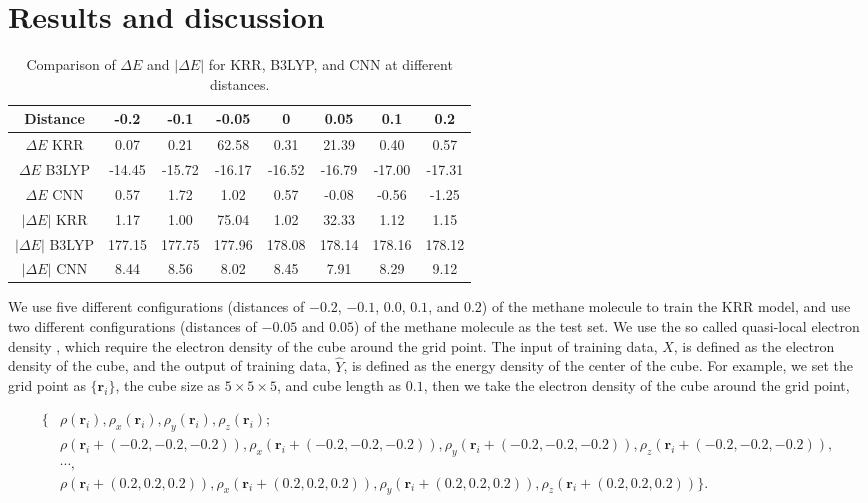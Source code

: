 \documentclass[%
twocolumn,
amsmath,amssymb,
groupedaddress,
reprint,%
]{revtex4-2}
\renewcommand{\>}{\rangle}
\newcommand{\<}{\langle}
\newcommand{\nl}{\nonumber \\}
\begin{document}
\section{Results and discussion}
\begin{table}[h!]
	\centering
	\begin{tabular}{|c|c|c|c|c|c|c|c|}
		\hline
		Distance           & -0.2   & -0.1   & -0.05  & 0      & 0.05   & 0.1    & 0.2    \\ \hline
		$\Delta E$ KRR     & 0.07   & 0.21   & 62.58  & 0.31   & 21.39  & 0.40   & 0.57   \\ \hline
		$\Delta E$ B3LYP   & -14.45 & -15.72 & -16.17 & -16.52 & -16.79 & -17.00 & -17.31 \\ \hline
		$\Delta E$ CNN     & 0.57   & 1.72   & 1.02   & 0.57   & -0.08  & -0.56  & -1.25  \\ \hline
		$|\Delta E|$ KRR   & 1.17   & 1.00   & 75.04  & 1.02   & 32.33  & 1.12   & 1.15   \\ \hline
		$|\Delta E|$ B3LYP & 177.15 & 177.75 & 177.96 & 178.08 & 178.14 & 178.16 & 178.12 \\ \hline
		$|\Delta E|$ CNN   & 8.44   & 8.56   & 8.02   & 8.45   & 7.91   & 8.29   & 9.12   \\ \hline
	\end{tabular}
	\caption{Comparison of $\Delta E$ and $|\Delta E|$ for KRR, B3LYP, and CNN at different distances.}
	\label{table:comparison}
\end{table}

We use five different configurations (distances of $-0.2$, $-0.1$, $0.0$, $0.1$, and $0.2$) of the methane molecule to train the KRR model, and use two different configurations (distances of $-0.05$ and $0.05$) of the methane molecule as the test set.
% 
We use the so called quasi-local electron density \cite{Zho197264}, which require the electron density of the cube around the grid point.
% 
The input of training data, $\hat X$, is defined as the electron density of the cube, and the output of training data, $\hat Y$, is defined as the energy density of the center of the cube.
% 
For example, we set the grid point as $\{\mathbf{r}_{i}\}$, the cube size as $5 \times 5 \times 5$, and cube length as $0.1$, then we take the electron density of the cube around the grid point,

\begin{widetext}
	\begin{align*}
		\{ & \rho(\mathbf{r}_{i}), \rho_{x} (\mathbf{r}_{i}), \rho_{y} (\mathbf{r}_{i}), \rho_{z} (\mathbf{r}_{i}); \nl
		   & \rho(\mathbf{r}_{i} + (-0.2, -0.2, -0.2)), \rho_{x} (\mathbf{r}_{i} + (-0.2, -0.2, -0.2)), \rho_{y} (\mathbf{r}_{i} + (-0.2, -0.2, -0.2)), \rho_{z} (\mathbf{r}_{i} + (-0.2, -0.2, -0.2)), \nl
		   & \cdots, \nl
		   & \rho(\mathbf{r}_{i} + (0.2, 0.2, 0.2)), \rho_{x} (\mathbf{r}_{i} + (0.2, 0.2, 0.2)), \rho_{y} (\mathbf{r}_{i} + (0.2, 0.2, 0.2)), \rho_{z} (\mathbf{r}_{i} + (0.2, 0.2, 0.2))\}.
	\end{align*}
\end{widetext}
\end{document}
